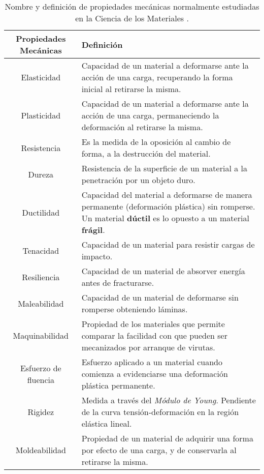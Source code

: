 \begin{table}[htp]
\begin{center}
\begin{tabular}{c C{10cm}}
\hline
\textbf{Propiedades Mecánicas} & \textbf{Definición} \\ \hline
 \hline

Elasticidad &
Capacidad de un material a deformarse ante la acción de una carga, recuperando la forma inicial al retirarse la misma. \\ \hline
 
Plasticidad &
Capacidad de un material a deformarse ante la acción de una carga, permaneciendo la deformación al retirarse la misma. \\ \hline 
 
Resistencia & 
Es la medida de la oposición al cambio de forma, a la destrucción del material. \\ \hline

Dureza & 
Resistencia de la superficie de un material a la penetración por un objeto duro.\\ \hline

Ductilidad & 
Capacidad del material a deformarse de manera permanente (deformación plástica) sin romperse. Un material \textbf{dúctil} es lo opuesto a un material \textbf{frágil}. \\ \hline

Tenacidad & 
Capacidad de un material para resistir cargas de impacto. \\ \hline

Resiliencia &
Capacidad de un material de absorver energía antes de fracturarse. \\ \hline

Maleabilidad & 
Capacidad de un material de deformarse sin romperse obteniendo láminas. \\ \hline

Maquinabilidad &
Propiedad de los materiales que permite comparar la facilidad con que pueden ser mecanizados por arranque de virutas. \\ \hline

Esfuerzo de fluencia & 
Esfuerzo aplicado a un material cuando comienza a evidenciarse una deformación plástica permanente.\\ \hline

Rigidez & 
Medida a través del \textit{Módulo de Young}. Pendiente de la curva tensión-deformación en la región elástica lineal. \\ \hline

Moldeabilidad &
Propiedad de un material de adquirir una forma por efecto de una carga, y de conservarla al retirarse la misma. \\ \hline

\end{tabular}
\end{center}
\caption[Nombre y definición de propiedades mecánicas.]{Nombre y definición de propiedades mecánicas normalmente estudiadas en la Ciencia de los Materiales \citep{askeland98}.}
\label{C1:tbl:propiedades}
\end{table}

